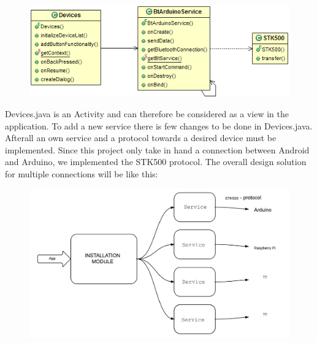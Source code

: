 	\begin{figure}[H]
	\centering
	\includegraphics[width=130mm]{images/BTConnection.png}
	\end{figure}

	Devices.java is an Activity and can therefore be considered as a view in the application. To add a new service there is few changes to be done in Devices.java. Afterall an own service and a protocol towards a desired device must be implemented. Since this project only take in hand a connection between Android and Arduino, we implemented the STK500 protocol.
	The overall design solution for multiple connections will be like this:\\
	\begin{figure}[H]
	\includegraphics[scale=0.7]{figures/OTAArchitecture.pdf}
	\end{figure}